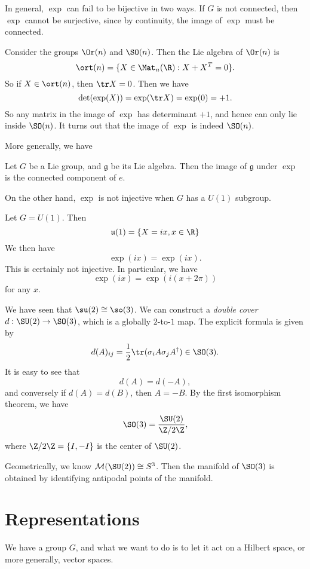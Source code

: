 \documentclass[a4paper]{article}
\begin{document}
In general, $\exp$ can fail to be bijective in two ways. If $G$ is not connected, then $\exp$ cannot be surjective, since by continuity, the image of $\exp$ must be connected.

\begin{eg}
  Consider the groups $\Or(n)$ and $\SO(n)$. Then the Lie algebra of $\Or(n)$ is
  \[
    \ort(n) = \{X \in \Mat_n(\R): X + X^T = 0\}.
  \]
  So if $X \in \ort(n)$, then $\tr X = 0$. Then we have
  \[
    \det (\exp(X)) = \exp(\tr X) = \exp(0) = +1.
  \]
  So any matrix in the image of $\exp$ has determinant $+1$, and hence can only lie inside $\SO(n)$. It turns out that the image of $\exp$ is indeed $\SO(n)$.
\end{eg}

More generally, we have
\begin{prop}
  Let $G$ be a Lie group, and $\mathfrak{g}$ be its Lie algebra. Then the image of $\mathfrak{g}$ under $\exp$ is the connected component of $e$.
\end{prop}

On the other hand, $\exp$ is not injective when $G$ has a $U(1)$ subgroup.
\begin{eg}
  Let $G = U(1)$. Then
  \[
    \mathfrak{u}(1) = \{X = ix, x \in \R\}
  \]
  We then have
  \[
    \exp(ix) = \exp(ix).
  \]
  This is certainly not injective. In particular, we have
  \[
    \exp(ix) = \exp(i(x + 2\pi))
  \]
  for any $x$.
\end{eg}

\begin{eg}[$\SU(2)$ vs $\SO(3)$]
  We have seen that $\su(2) \cong \so(3)$. We can construct a \emph{double cover} $d: \SU(2) \to \SO(3)$, which is a globally $2$-to-$1$ map. The explicit formula is given by
  \[
    d(A)_{ij} = \frac{1}{2} \tr (\sigma_i A\sigma_j A^\dagger) \in \SO(3).
  \]
  It is easy to see that
  \[
    d(A) = d(-A),
  \]
  and conversely if $d(A) = d(B)$, then $A = -B$. By the first isomorphism theorem, we have
  \[
    \SO(3) = \frac{\SU(2)}{\Z/2\Z},
  \]
  where $\Z/2\Z = \{I, -I\}$ is the center of $\SU(2)$.

  Geometrically, we know $\mathcal{M}(\SU(2)) \cong S^3$. Then the manifold of $\SO(3)$ is obtained by identifying antipodal points of the manifold.
\end{eg}

\section{Representations}
We have a group $G$, and what we want to do is to let it act on a Hilbert space, or more generally, vector spaces.
\end{document}
